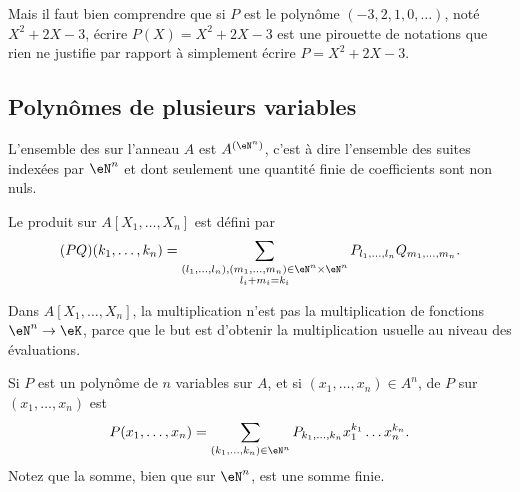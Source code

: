 Mais il faut bien comprendre que si \( P\) est le polynôme \( (-3,2,1,0,\ldots)\), noté \( X^2+2X-3\), écrire \( P(X)=X^2+2X-3\) est une pirouette de notations que rien ne justifie par rapport à simplement écrire \( P=X^2+2X-3\).

\subsection{Polynômes de plusieurs variables}

\begin{definition}      \label{DEFooZNHOooCruuwI}
    L'ensemble des  sur l'anneau \( A\) est \( A^{(\eN^n)}\), c'est à dire l'ensemble des suites indexées par \( \eN^n\) et dont seulement une quantité finie de coefficients sont non nuls.

    Le produit sur \( A[X_1,\ldots, X_n]\) est défini par
    \begin{equation}
        (PQ)(k_1,\ldots, k_n)=\sum_{\substack{ (l_1,\ldots, l_n),(m_1,\ldots, m_n)\in \eN^n\times \eN^n   \\l_i+m_i=k_i}}P_{l_1,\ldots, l_n}Q_{m_1,\ldots, m_n}.
        \end{equation}
\end{definition}

\begin{normaltext}
    Dans \( A[X_1,\ldots, X_n]\), la multiplication n'est pas la multiplication de fonctions \( \eN^n\to \eK\), parce que le but est d'obtenir la multiplication usuelle au niveau des évaluations.
\end{normaltext}

\begin{definition}
    Si \( P\) est un polynôme de \( n\) variables sur \( A\), et si \( (x_1,\ldots, x_n)\in A^n\),  de \( P\) sur \( (x_1,\ldots, x_n)\) est
    \begin{equation}
        P(x_1,\ldots, x_n)=\sum_{(k_1,\ldots, k_n)\in \eN^n}P_{k_1,\ldots, k_n}x_1^{k_1}\ldots x_n^{k_n}.
    \end{equation}
    Notez que la somme, bien que sur \( \eN^n\), est une somme finie.
\end{definition}

